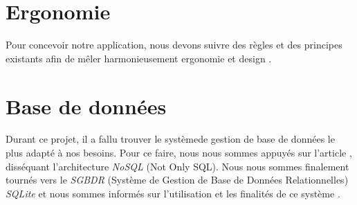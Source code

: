 \section{Ergonomie}
Pour concevoir notre application, nous devons suivre des règles et des principes existants afin de mêler harmonieusement ergonomie et design \cite{lente2014scenariser}.

\section{Base de données}

Durant ce projet, il a fallu trouver le systèmede gestion de base de données le plus adapté à nos besoins. Pour ce faire, nous nous sommes appuyés sur l'article \cite{strauchnosql}, disséquant l'architecture \textit{NoSQL} (Not Only SQL).
Nous nous sommes finalement tournés vers le \textit{SGBDR} (Système de Gestion de Base de Données Relationnelles) \textit{SQLite} et nous sommes informés sur l'utilisation et les finalités de ce système \cite{kreibich2010using}.

